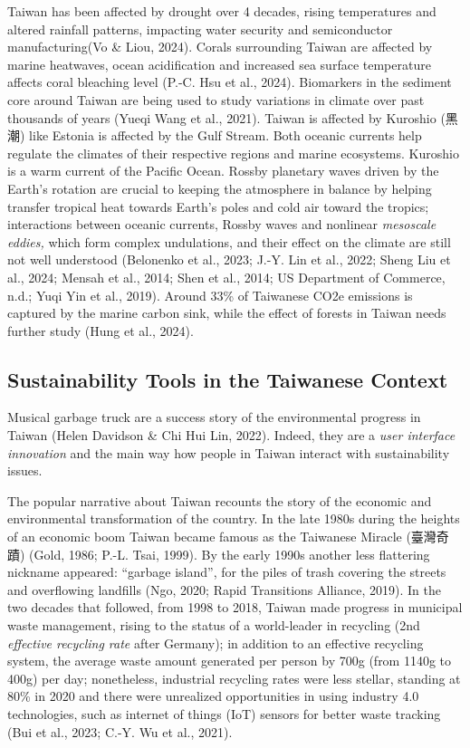 \documentclass[
  letterpaper,
  DIV=11,
  numbers=noendperiod]{scrartcl}
\begin{document}
Taiwan has been affected by drought over 4 decades, rising temperatures
and altered rainfall patterns, impacting water security and
semiconductor manufacturing\hspace{0pt}(Vo \& Liou, 2024). Corals
surrounding Taiwan are affected by marine heatwaves, ocean acidification
and increased sea surface temperature affects coral bleaching level
(P.-C. Hsu et al., 2024). Biomarkers in the sediment core around Taiwan
are being used to study variations in climate over past thousands of
years (Yueqi Wang et al., 2021). Taiwan is affected by Kuroshio (黑潮)
like Estonia is affected by the Gulf Stream. Both oceanic currents help
regulate the climates of their respective regions and marine ecosystems.
Kuroshio is a warm current of the Pacific Ocean. Rossby planetary waves
driven by the Earth's rotation are crucial to keeping the atmosphere in
balance by helping transfer tropical heat towards Earth's poles and cold
air toward the tropics; interactions between oceanic currents, Rossby
waves and nonlinear \emph{mesoscale eddies,} which form complex
undulations, and their effect on the climate are still not well
understood (Belonenko et al., 2023; J.-Y. Lin et al., 2022; Sheng Liu et
al., 2024; Mensah et al., 2014; Shen et al., 2014; US Department of
Commerce, n.d.; Yuqi Yin et al., 2019). Around 33\% of Taiwanese CO2e
emissions is captured by the marine carbon sink, while the effect of
forests in Taiwan needs further study (Hung et al., 2024).

\subsection{Sustainability Tools in the Taiwanese
Context}\label{sustainability-tools-in-the-taiwanese-context}

Musical garbage truck are a success story of the environmental progress
in Taiwan (Helen Davidson \& Chi Hui Lin, 2022). Indeed, they are a
\emph{user interface innovation} and the main way how people in Taiwan
interact with sustainability issues.

The popular narrative about Taiwan recounts the story of the economic
and environmental transformation of the country. In the late 1980s
during the heights of an economic boom Taiwan became famous as the
Taiwanese Miracle (臺灣奇蹟) (Gold, 1986; P.-L. Tsai, 1999). By the
early 1990s another less flattering nickname appeared: ``garbage
island'', for the piles of trash covering the streets and overflowing
landfills (Ngo, 2020; Rapid Transitions Alliance, 2019). In the two
decades that followed, from 1998 to 2018, Taiwan made progress in
municipal waste management, rising to the status of a world-leader in
recycling (2nd \emph{effective recycling rate} after Germany); in
addition to an effective recycling system, the average waste amount
generated per person by 700g (from 1140g to 400g) per day; nonetheless,
industrial recycling rates were less stellar, standing at 80\% in 2020
and there were unrealized opportunities in using industry 4.0
technologies, such as internet of things (IoT) sensors for better waste
tracking (Bui et al., 2023; C.-Y. Wu et al., 2021).
\end{document}
